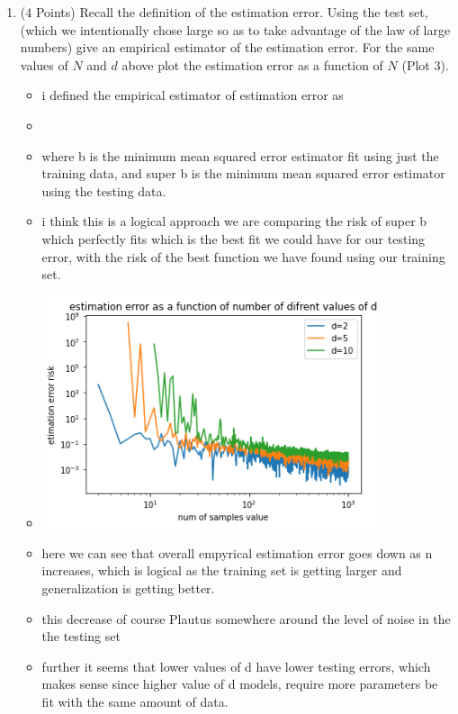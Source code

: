 \documentclass{article}
\begin{document}
\begin{enumerate}
\begin{itemize}
    \end{itemize}

    \item (4 Points) Recall the definition of the estimation error. Using the test set, (which we intentionally chose large so as to take advantage of the law of large numbers) give an empirical estimator of the estimation error. For the same values of $N$ and $d$ above plot the estimation error as a function of $N$ (Plot 3).
    \begin{itemize}
    \item i defined the empirical estimator of estimation error as    
            \item \inputminted[firstline=78, lastline=79, breaklines=True]{python}{hw1_code_source.py}
            \item where b is the minimum mean squared error estimator fit using just the training data, and super b is the minimum mean squared error estimator using the testing data. 
            \item i think this is a logical approach we are comparing the risk of super b which perfectly fits which is the best fit we could have for our testing error, with the risk of the best function we have found using our training set. 
        \item\includegraphics[width=10cm]{homework/homework_1/estimation_2.png}
        \item here we can see that overall empyrical estimation error goes down as n increases, which is logical as the training set is getting larger and generalization is getting better. 
        \item this decrease of course Plautus somewhere around the level of noise in the the testing set
        \item further it seems that lower values of d have lower testing errors, which makes sense since higher value of d models, require more parameters be fit with the same amount of data. 

\end{itemize}
\end{enumerate}
\end{document}
